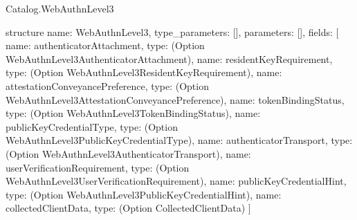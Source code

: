 \begin{lexlean}{Catalog.WebAuthnLevel3}
\begin{semanticmodule}
structure{
  name: WebAuthnLevel3,
  type_parameters: [],
  parameters: [],
  fields: [
    {name: authenticatorAttachment, type: (Option WebAuthnLevel3AuthenticatorAttachment)},
    {name: residentKeyRequirement, type: (Option WebAuthnLevel3ResidentKeyRequirement)},
    {name: attestationConveyancePreference, type: (Option WebAuthnLevel3AttestationConveyancePreference)},
    {name: tokenBindingStatus, type: (Option WebAuthnLevel3TokenBindingStatus)},
    {name: publicKeyCredentialType, type: (Option WebAuthnLevel3PublicKeyCredentialType)},
    {name: authenticatorTransport, type: (Option WebAuthnLevel3AuthenticatorTransport)},
    {name: userVerificationRequirement, type: (Option WebAuthnLevel3UserVerificationRequirement)},
    {name: publicKeyCredentialHint, type: (Option WebAuthnLevel3PublicKeyCredentialHint)},
    {name: collectedClientData, type: (Option CollectedClientData)}
  ]
}
\end{semanticmodule}
\end{lexlean}
